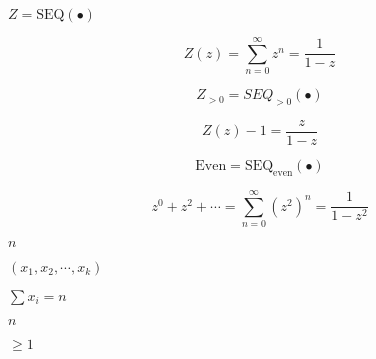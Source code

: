 \documentclass[10pt]{book}
\begin{document}
\begin{mdSnippets}
\begin{mdInlineSnippet}%
$Z=\text{SEQ}(\bullet)$\end{mdInlineSnippet}%
\begin{mdDisplaySnippet}%
\[%
Z(z) = \sum_{n=0}^\infty  z^n = \frac{1}{1 - z}
\]%
\end{mdDisplaySnippet}%
\begin{mdDisplaySnippet}%
\[%
  Z_{> 0} = SEQ_{>0}(\bullet)
\]%
\end{mdDisplaySnippet}%
\begin{mdDisplaySnippet}[f08dc0d52577c3c4b4f0637f9089edab]%
\[%
  Z(z) - 1 = \frac{z}{1-z} 
\]%
\end{mdDisplaySnippet}%
\begin{mdDisplaySnippet}[9e51079147b49ce2a0c5d94df83d3e75]%
\[%
  \text{Even} = \text{SEQ}_{\text{even}}(\bullet)
\]%
\end{mdDisplaySnippet}%
\begin{mdDisplaySnippet}%
\[%
  z^0+z^2+\cdots = \sum_{n=0}^\infty (z^2)^n = \frac{1}{1-z^2}
\]%
\end{mdDisplaySnippet}%
\begin{mdInlineSnippet}[7b8b965ad4bca0e41ab51de7b31363a1]%
$n$\end{mdInlineSnippet}%
\begin{mdInlineSnippet}%
$(x_1,x_2,\cdots,x_k)$\end{mdInlineSnippet}%
\begin{mdInlineSnippet}[4edcda6935374226723f6450855eb43b]%
$\sum x_i = n$\end{mdInlineSnippet}%
\begin{mdInlineSnippet}[7b8b965ad4bca0e41ab51de7b31363a1]%
$n$\end{mdInlineSnippet}%
\begin{mdInlineSnippet}[190e98cf0a6ba7a8b6ed2eafbfb4e8ea]%
$\geq 1$\end{mdInlineSnippet}%
\begin{mdInlineSnippet}%

\end{mdInlineSnippet}
\end{mdSnippets}
\end{document}
